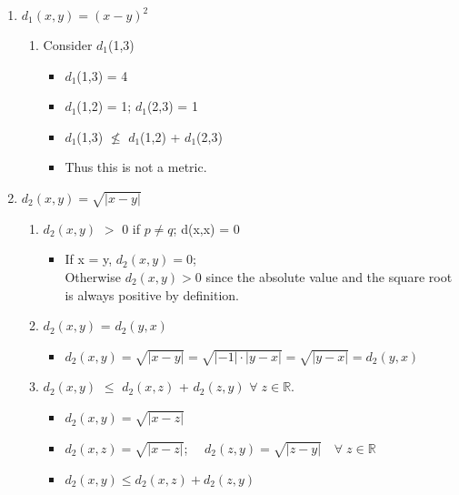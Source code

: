 \documentclass[12pt]{article}
\begin{document}
\begin{enumerate}[label=(\roman*)]
    \item $d_1(x,y) = (x-y)^2$
        \begin{enumerate}[label=(\alph*), start=3]
            \item Consider $d_1$(1,3)
                \begin{itemize}
                    \item $d_1$(1,3) = 4
                    \item $d_1$(1,2) = 1; $d_1$(2,3) = 1
                    \item $d_1$(1,3) $\nleq$ $d_1$(1,2) + $d_1$(2,3)
                    \item Thus this is not a metric.\\
                \end{itemize}
        \end{enumerate}
        
    \item $d_2(x,y) = \sqrt{|x - y|}$
        \begin{enumerate}[label=(\alph*)]
            \item $d_2(x,y)$ $>$ 0 if $p\neq q$; d(x,x) = 0
                
                \begin{itemize}
                    \item If x = y, $d_2(x,y) = 0$;\\ 
                    Otherwise $d_2(x,y) > 0$ since the absolute value and the square root is always positive by definition.                 \end{itemize}
                
            \item $d_2(x,y)$ = $d_2(y,x)$
                \begin{itemize}
                    \item $d_2(x,y) = \sqrt{|x - y|} = \sqrt{|-1|\cdot |y - x|} = \sqrt{|y - x|} = d_2(y,x)$
                \end{itemize}
            
            \item $d_2(x,y)$ $\le$ $d_2(x,z)$ + $d_2(z,y)$ \;\;$\forall\; z\in \mathbb{R}$.
                \begin{itemize}
                    \item $d_2(x,y) = \sqrt{|x - z|}$
                    \item $d_2(x,z) = \sqrt{|x - z|}$;   $\quad d_2(z,y) = \sqrt{|z - y|}\quad\forall\;z \in \mathbb{R}$
                    \item $d_2(x,y) \le d_2(x,z) + d_2(z,y)$\\
                \end{itemize}
        \end{enumerate}
    

\end{enumerate}
\end{document}
